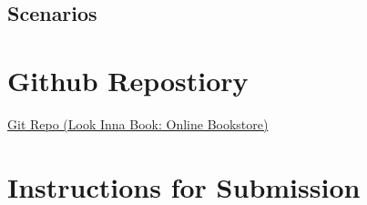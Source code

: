 \documentclass[a4 paper]{article}
\begin{document}
\subsection{Scenarios}
\section{Github Repostiory}
\href{https://github.com/WalterMitty2112/Online-Bookstore-Webapp}{Git Repo (Look Inna Book: Online Bookstore)}
\section{Instructions for Submission}
\end{document}
